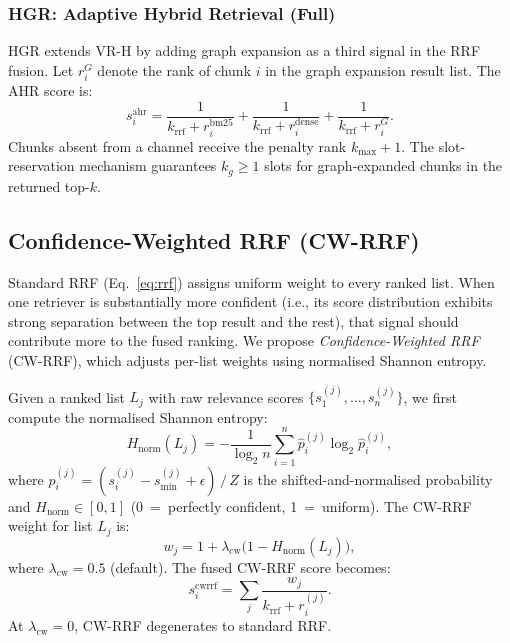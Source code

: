 \documentclass[journal]{IEEEtran}
\begin{document}
\subsubsection*{HGR: Adaptive Hybrid Retrieval (Full)}
HGR extends VR-H by adding graph expansion as a third signal
in the RRF fusion. Let $r_i^{G}$ denote the rank of chunk $i$
in the graph expansion result list. The AHR score is:
\begin{equation}
  s_i^{\mathrm{ahr}} = \frac{1}{k_\text{rrf} + r_i^{\mathrm{bm25}}}
                     + \frac{1}{k_\text{rrf} + r_i^{\mathrm{dense}}}
                     + \frac{1}{k_\text{rrf} + r_i^{G}}.
  \label{eq:ahr}
\end{equation}
Chunks absent from a channel receive the penalty rank $k_{\max}+1$.
The slot-reservation mechanism guarantees $k_g \geq 1$ slots for
graph-expanded chunks in the returned top-$k$.

\subsection{Confidence-Weighted RRF (CW-RRF)}
\label{sec:cwrrf}
Standard RRF (Eq.~\ref{eq:rrf}) assigns uniform weight to every
ranked list. When one retriever is substantially more confident
(i.e., its score distribution exhibits strong separation between
the top result and the rest), that signal should contribute more
to the fused ranking. We propose \emph{Confidence-Weighted RRF}
(CW-RRF), which adjusts per-list weights using normalised Shannon
entropy.

Given a ranked list $L_j$ with raw relevance scores
$\{s_1^{(j)}, \ldots, s_n^{(j)}\}$, we first compute the
normalised Shannon entropy:
\begin{equation}
  H_{\mathrm{norm}}(L_j)
    = -\frac{1}{\log_2 n}
      \sum_{i=1}^{n} \hat{p}_i^{(j)} \log_2 \hat{p}_i^{(j)},
  \label{eq:entropy}
\end{equation}
where $\hat{p}_i^{(j)} = (s_i^{(j)} - s_{\min}^{(j)} + \epsilon)
\,/\, Z$ is the shifted-and-normalised probability and
$H_{\mathrm{norm}} \in [0,1]$ (0~=~perfectly confident,
1~=~uniform). The CW-RRF weight for list $L_j$ is:
\begin{equation}
  w_j = 1 + \lambda_{\mathrm{cw}} \bigl(1 - H_{\mathrm{norm}}(L_j)\bigr),
  \label{eq:cwrrf_weight}
\end{equation}
where $\lambda_{\mathrm{cw}} = 0.5$ (default). The fused CW-RRF
score becomes:
\begin{equation}
  s_i^{\mathrm{cwrrf}} = \sum_{j} \frac{w_j}{k_{\mathrm{rrf}} + r_i^{(j)}}.
  \label{eq:cwrrf}
\end{equation}
At $\lambda_{\mathrm{cw}} = 0$, CW-RRF degenerates to standard RRF.
\end{document}
